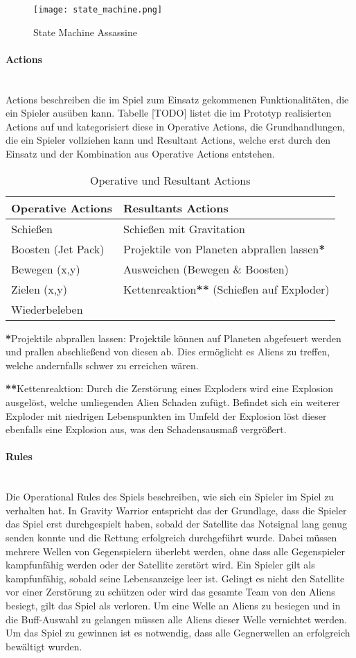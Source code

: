 \documentclass[11pt]{scrartcl}
\newcommand{\lbparagraph}[1]{\paragraph*{#1}\mbox{}\\}
\begin{document}
\begin{figure}[htp]
	\centering
	\texttt{[image: state\_machine.png]}
	\caption{State Machine Assassine}
	\label{fig:state_machine}
\end{figure}

\lbparagraph{Actions}
Actions beschreiben die im Spiel zum Einsatz gekommenen Funktionalitäten, die ein Spieler ausüben kann. Tabelle [TODO] listet die im Prototyp realisierten Actions auf und kategorisiert diese in Operative Actions, die Grundhandlungen, die ein Spieler vollziehen kann und Resultant Actions, welche erst durch den Einsatz und der Kombination aus Operative Actions entstehen.


\begin{table}[htp]
\centering
\begin{tabular}{|l|l|}
\hline
\textbf{Operative Actions}&\textbf{Resultants Actions} \\
\hline
Schießen&Schießen mit Gravitation \\
\hline
Boosten (Jet Pack)&Projektile von Planeten abprallen lassen\textbf{*}\\
\hline
Bewegen (x,y)&Ausweichen (Bewegen \& Boosten)\\
\hline
Zielen (x,y)&Kettenreaktion\textbf{**} (Schießen auf Exploder)\\
\hline
Wiederbeleben&\\
\hline
\end{tabular}
\caption{Operative und Resultant Actions}
\label{tab:meinetabelle}
\end{table}

\textbf{*}Projektile abprallen lassen: Projektile können auf Planeten abgefeuert werden und prallen abschließend von diesen ab. Dies ermöglicht es Aliens zu treffen, welche andernfalls schwer zu erreichen wären.

\textbf{**}Kettenreaktion: Durch die Zerstörung eines Exploders wird eine Explosion ausgelöst, welche umliegenden Alien Schaden zufügt. Befindet sich ein weiterer Exploder mit niedrigen Lebenspunkten im Umfeld der Explosion löst dieser ebenfalls eine Explosion aus, was den Schadensausmaß vergrößert. 


\lbparagraph{Rules}
Die Operational Rules des Spiels beschreiben, wie sich ein Spieler im Spiel zu verhalten hat\cite{K2011}. In Gravity Warrior entspricht das der Grundlage, dass die Spieler das Spiel erst durchgespielt haben, sobald der Satellite das Notsignal lang genug senden konnte und die Rettung erfolgreich durchgeführt wurde. Dabei müssen mehrere Wellen von Gegenspielern überlebt werden, ohne dass alle Gegenspieler kampfunfähig werden oder der Satellite zerstört wird. Ein Spieler gilt als kampfunfähig, sobald seine Lebensanzeige leer ist. Gelingt es nicht den Satellite vor einer Zerstörung zu schützen oder wird das gesamte Team von den Aliens besiegt, gilt das Spiel als verloren. Um eine Welle an Aliens zu besiegen und in die Buff-Auswahl zu gelangen müssen alle Aliens dieser Welle vernichtet werden. Um das Spiel zu gewinnen ist es notwendig, dass alle Gegnerwellen an erfolgreich bewältigt wurden.
\end{document}
